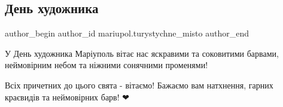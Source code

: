  
 
 
 
 

\subsection{День художника}
\label{sec:10_10_2021.fb.mariupol.turystychne_misto.1.den_hudozhnika}

\ifcmt
 author_begin
   author_id mariupol.turystychne_misto
 author_end
\fi

У День художника Маріуполь вітає нас яскравими та соковитими барвами,
неймовірним небом та ніжними сонячними променями! 🍁

Всіх причетних до цього свята - вітаємо! Бажаємо вам натхнення, гарних
краєвидів та неймовірних барв! ❤
